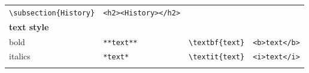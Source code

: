 \documentclass[10pt,fleqn]{wlpeerj}
\begin{document}
\begin{longtable}[c]{@{}llll@{}}
\begin{minipage}[t]{0.33\columnwidth}\raggedright\strut
\texttt{\textbackslash{}subsection\{History\}}
\strut\end{minipage} &
\begin{minipage}[t]{0.27\columnwidth}\raggedright\strut
\texttt{\textless{}h2\textgreater{}\textless{}History\textgreater{}\textless{}/h2\textgreater{}}
\strut\end{minipage}\tabularnewline
\begin{minipage}[t]{0.11\columnwidth}\raggedright\strut
\textbf{text style}
\strut\end{minipage} &
\begin{minipage}[t]{0.17\columnwidth}\raggedright\strut
\strut\end{minipage} &
\begin{minipage}[t]{0.33\columnwidth}\raggedright\strut
\strut\end{minipage}\tabularnewline
\begin{minipage}[t]{0.11\columnwidth}\raggedright\strut
bold
\strut\end{minipage} &
\begin{minipage}[t]{0.17\columnwidth}\raggedright\strut
\texttt{**text**}
\strut\end{minipage} &
\begin{minipage}[t]{0.33\columnwidth}\raggedright\strut
\texttt{\textbackslash{}textbf\{text\}}
\strut\end{minipage} &
\begin{minipage}[t]{0.27\columnwidth}\raggedright\strut
\texttt{\textless{}b\textgreater{}text\textless{}/b\textgreater{}}
\strut\end{minipage}\tabularnewline
\begin{minipage}[t]{0.11\columnwidth}\raggedright\strut
italics
\strut\end{minipage} &
\begin{minipage}[t]{0.17\columnwidth}\raggedright\strut
\texttt{*text*}
\strut\end{minipage} &
\begin{minipage}[t]{0.33\columnwidth}\raggedright\strut
\texttt{\textbackslash{}textit\{text\}}
\strut\end{minipage} &
\begin{minipage}[t]{0.27\columnwidth}\raggedright\strut
\texttt{\textless{}i\textgreater{}text\textless{}/i\textgreater{}}
\strut\end{minipage}\tabularnewline
\begin{minipage}[t]{0.11\columnwidth}\raggedright\strut

\end{minipage}
\end{longtable}
\end{document}

